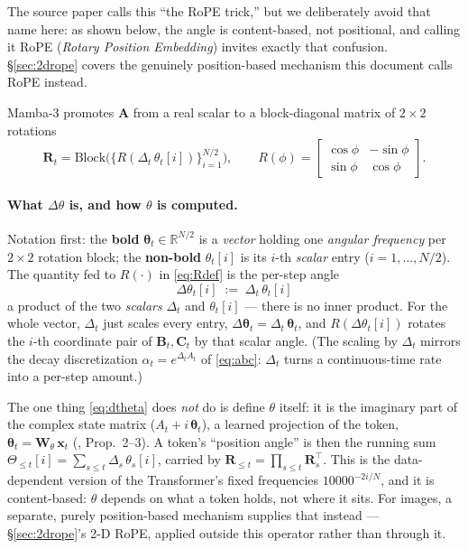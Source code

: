 \documentclass[11pt,a4paper]{article}
\begin{document}
The source paper calls this ``the RoPE trick,'' but we deliberately avoid that name
here: as shown below, the angle is content-based, not positional, and calling it RoPE
(\emph{Rotary Position Embedding}) invites exactly that confusion. \S\ref{sec:2drope}
covers the genuinely position-based mechanism this document calls RoPE instead.

Mamba-3 promotes $\bm{A}$ from a real scalar to a block-diagonal
matrix of $2{\times}2$ rotations
\begin{equation}\label{eq:Rdef}
  \bm{R}_t = \mathrm{Block}\bigl(\{R(\Delta_t\,\theta_t[i])\}_{i=1}^{N/2}\bigr),
  \qquad
  R(\phi) = \begin{bmatrix}\cos\phi & -\sin\phi\\ \sin\phi & \cos\phi\end{bmatrix}.
\end{equation}

\paragraph{What $\Delta\theta$ is, and how $\theta$ is computed.}
Notation first: the \textbf{bold} $\bm{\theta}_t\in\mathbb{R}^{N/2}$ is a
\emph{vector} holding one \emph{angular frequency} per $2{\times}2$ rotation
block; the \textbf{non-bold} $\theta_t[i]$ is its $i$-th \emph{scalar} entry
($i=1,\dots,N/2$). The quantity fed to $R(\cdot)$ in \eqref{eq:Rdef} is the
per-step angle
\begin{equation}\label{eq:dtheta}
  \boxed{\;\Delta\theta_t[i] \;:=\; \Delta_t\,\theta_t[i]\;}
\end{equation}
a product of the two \emph{scalars} $\Delta_t$ and $\theta_t[i]$ --- there is no
inner product. For the whole vector, $\Delta_t$ just scales every entry,
$\Delta\bm{\theta}_t=\Delta_t\,\bm{\theta}_t$, and $R(\Delta\theta_t[i])$ rotates
the $i$-th coordinate pair of $\bm{B}_t,\bm{C}_t$ by that scalar angle. (The
scaling by $\Delta_t$ mirrors the decay discretization $\alpha_t=e^{\Delta_t A_t}$
of \eqref{eq:abc}: $\Delta_t$ turns a continuous-time rate into a per-step
amount.)

The one thing \eqref{eq:dtheta} does \emph{not} do is define $\theta$ itself:
it is the imaginary part of the complex state matrix ($A_t+i\,\bm{\theta}_t$), a
learned projection of the token, $\bm{\theta}_t=\bm{W}_\theta\,\bm{x}_t$
(\cite{mamba3}, Prop.~2--3). A token's ``position angle'' is then the running sum
$\Theta_{\le t}[i]=\sum_{s\le t}\Delta_s\,\theta_s[i]$, carried by
$\bm{R}_{\le t}=\prod_{s\le t}\bm{R}_s^\top$. This is the data-dependent version
of the Transformer's fixed frequencies $10000^{-2i/N}$, and it is
content-based: $\theta$ depends on what a token holds, not where it sits. For
images, a separate, purely position-based mechanism supplies that instead ---
\S\ref{sec:2drope}'s 2-D RoPE, applied outside this operator rather than through
it.
\end{document}
